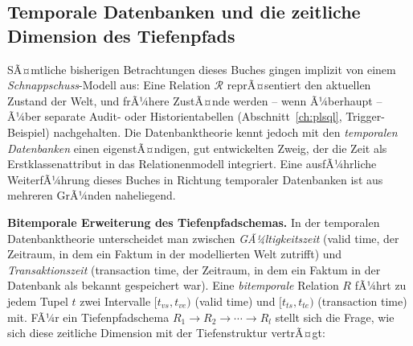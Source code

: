 ﻿\documentclass[a4paper,12pt]{report}
\theoremstyle{definition}
\theoremstyle{remark}
\newcommand{\R}{\mathcal{R}}
\begin{document}
\subsection{Temporale Datenbanken und die zeitliche Dimension des Tiefenpfads}
\label{sec:ausblick-temporal}

SÃ¤mtliche bisherigen Betrachtungen dieses Buches gingen implizit von
einem \emph{Schnappschuss}-Modell aus: Eine Relation $\R$ reprÃ¤sentiert
den aktuellen Zustand der Welt, und frÃ¼here ZustÃ¤nde werden -- wenn
Ã¼berhaupt -- Ã¼ber separate Audit- oder Historientabellen
(Abschnitt~\ref{ch:plsql}, Trigger-Beispiel) nachgehalten. Die
Datenbanktheorie kennt jedoch mit den \emph{temporalen Datenbanken}
einen eigenstÃ¤ndigen, gut entwickelten Zweig, der die Zeit als
Erstklassenattribut in das Relationenmodell integriert. Eine
ausfÃ¼hrliche WeiterfÃ¼hrung dieses Buches in Richtung temporaler
Datenbanken ist aus mehreren GrÃ¼nden naheliegend.

\textbf{Bitemporale Erweiterung des Tiefenpfadschemas.} In der
temporalen Datenbanktheorie unterscheidet man zwischen
\emph{GÃ¼ltigkeitszeit} (valid time, der Zeitraum, in dem ein Faktum in
der modellierten Welt zutrifft) und \emph{Transaktionszeit}
(transaction time, der Zeitraum, in dem ein Faktum in der Datenbank
als bekannt gespeichert war). Eine \emph{bitemporale} Relation $R$
fÃ¼hrt zu jedem Tupel $t$ zwei Intervalle
$[t_{vs},t_{ve})$ (valid time) und $[t_{ts},t_{te})$ (transaction
time) mit. FÃ¼r ein Tiefenpfadschema $R_1\to R_2\to\cdots\to R_l$ stellt
sich die Frage, wie sich diese zeitliche Dimension mit der
Tiefenstruktur vertrÃ¤gt:
\end{document}
